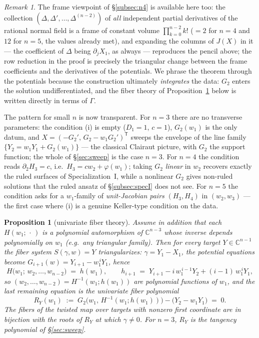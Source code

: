 \documentclass[11pt]{article}
\theoremstyle{plain}
\newtheorem{proposition}[theorem]{Proposition}
\theoremstyle{definition}
\theoremstyle{remark}
\newtheorem{remark}[theorem]{Remark}
\newcommand{\C}{\mathbb{C}}
\begin{document}
\begin{remark}
The frame viewpoint of \S\ref{subsec:n4} is available here too: the collection
$(\Delta,\Delta',\dots,\Delta^{(n-2)})$ of \emph{all} independent partial
derivatives of the rational normal field is a frame of constant volume
$\prod_{k=0}^{n-2}k!$ ($=2$ for $n=4$ and $12$ for $n=5$, the values already
met), and expanding the columns of $J(X)$ in it --- the coefficient of
$\Delta$ being $\partial_jX_1$, as always --- reproduces the pencil above; the
row reduction in the proof is precisely the triangular change between the
frame coefficients and the derivatives of the potentials. We phrase the
theorem through the potentials because the construction ultimately
\emph{integrates} the data: $G_2$ enters the solution undifferentiated, and
the fiber theory of Proposition~\ref{prop:curvefib} below is written directly
in terms of $\Gamma$.
\end{remark}

The pattern for small $n$ is now transparent. For $n=3$ there are no
transverse parameters: the condition (i) is empty ($D_1=1$, $c=1$), $G_2(w_1)$
is the only datum, and $X=(-G_2',\,G_2-w_1G_2')^{\mathsf T}$ sweeps the envelope of the
line family $\{Y_2=w_1Y_1+G_2(w_1)\}$ --- the classical Clairaut picture, with
$G_2$ the support function; the whole of \S\ref{sec:sweep} is the case $n=3$.
For $n=4$ the condition reads $\partial_2H_3=c$, i.e.\ $H_3=cw_2+\varphi(w_1)$;
taking $G_2$ \emph{linear} in $w_2$ recovers exactly the ruled surfaces of
Specialization~I, while a nonlinear $G_2$ gives non-ruled solutions that the
ruled ansatz of \S\ref{subsec:specI} does not see. For $n=5$ the condition
asks for a $w_1$-family of \emph{unit-Jacobian pairs}
$(H_3,H_4)$ in $(w_2,w_3)$ --- the first case where (i) is a genuine
Keller-type condition on the data.

\begin{proposition}[univariate fiber theory]\label{prop:curvefib}
Assume in addition that each $H(w_1;\,\cdot\,)$ is a polynomial automorphism
of $\C^{n-3}$ whose inverse depends polynomially on $w_1$ (e.g.\ any
triangular family). Then for every target $Y\in\C^{n-1}$ the fiber system
$S(\gamma,w)=Y$ triangularizes: $\gamma=Y_1-X_1$, the potential equations
become $G_{i+1}(w)=Y_{i+1}-w_1^{\,i}Y_1$, hence
\[
H\bigl(w_1;\,w_2,\dots,w_{n-2}\bigr)\;=\;h(w_1),
\qquad
h_{i+1}\;=\;Y_{i+1}-i\,w_1^{\,i-1}Y_2+(i-1)\,w_1^{\,i}Y_1 ,
\]
so $(w_2,\dots,w_{n-2})=H^{-1}(w_1;h(w_1))$ are polynomial functions of $w_1$,
and the last remaining equation is the univariate \emph{fiber polynomial}
\[
R_Y(w_1)\;:=\;G_2\bigl(w_1,\,H^{-1}(w_1;h(w_1))\bigr)-\bigl(Y_2-w_1Y_1\bigr)
\;=\;0 .
\]
The fibers of the twisted map over targets with nonzero first coordinate are
in bijection with the roots of $R_Y$ at which $\gamma\neq0$. For $n=3$, $R_Y$
is the tangency polynomial of \S\ref{sec:sweep}.
\end{proposition}
\end{document}
